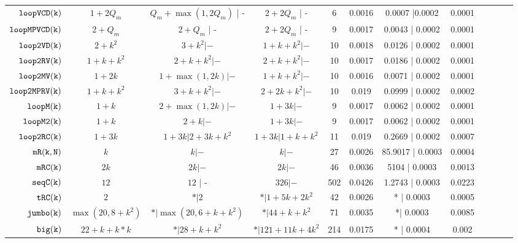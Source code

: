 {\begin {table}[H]
\begin{center}
{\begin{tabular}{| >{\tiny}r | c | c | c | c | c | c | c | c | c | c | c }
         $  {\mathtt{loopVCD(k)}} $ & ${1 + 2Q_m}$ &  ${Q_m+\max(1,2Q_m)}$ | - & $2+2Q_m$ | -  &  6 & 0.0016 & 0.0007 |0.0002 & 0.0001 \\
         $ {\mathtt{loopMPVCD(k)}}$ & $2+Q_m$ &  $2 + Q_m$ | - & $2+2Q_m$ | -  &   9 & 0.0017 & 0.0043 | 0.0002 & 0.0001 \\
         $  \mathtt{loop2VD(k)}$ & $2 + k^2$ &   $3 + k^2| -$ & $1 + k + k^2|- $   &  10 & 0.0018 & 0.0126 | 0.0002 & 0.0001  \\
         $  \mathtt{loop2RV(k)}$ & $1 + k +  k^2$ &  
         $ 2 + k +  k^2 | -$ 
         &  $2 + k + k^2| -$   &  10 & 0.0017 & 0.0186 | 0.0002 & 0.0001  \\
         $  \mathtt{loop2MV(k)}$ & $1 + 2k $ & $1 + \max(1,2k) | -$ &  $1 + k + k^2 |-$  & 10 & 0.0016 & 0.0071 | 0.0002 & 0.0001 \\
         $ \mathtt{loop2MPRV(k)}$ & $1 + k + k^2$ &  $3 + k + k^2  | -$ &  $2 + 2k + k^2 | - $  &  10 & 0.019 & 0.0999 | 0.0002 & 0.0002 \\
         {$ \mathtt{loopM(k)}$} & $1 + k$ &  $ 2 + \max(1,2k) | -$ & $1 + 3k | - $  &  9 & 0.0017 & 0.0062 | 0.0002 & 0.0001  \\
         {$ \mathtt{loopM2(k)}$} & $1 + k$ &  $ 2 + k | -$ & $1 + 3k | - $  &  9 & 0.0017 & 0.0062 | 0.0002 & 0.0001  \\
         {$\mathtt{loop2RC(k)}$} & $1 + 3k$ &  $1 + 3k | 2 + 3k + k^2$ &  $1 + 3k | 1 + k + k^2$  &  11 & 0.019 & 0.2669 | 0.0002 & 0.0007 \\
         $  \mathtt{mR(k, N)}$ & $k$ & $ k | -  $ & $k |-$   &  27 & 0.0026 & 85.9017 | 0.0003 & 0.0004 \\
         $  \mathtt{mRC(k)}$ & $2k$ & $  2k | -$ & $ 2k | -$   &  46 & 0.0036 & 5104 | 0.0003 &  0.0013\\
         $  \mathtt{seqC(k)}$ & $12$ & $12  $ | - & $326 | -$  &  502 & 0.0426  & 1.2743 | 0.0003 & 0.0223 \\
         $  \mathtt{tRC(k)}$ & $2$ &  $ * | 2$ & $* | 1 + 5k + 2 k^2 $  &  42 & 0.0026 & * | 0.0003 & 0.0005\\
         $  \mathtt{{jumbo(k)}}$ & $ \max(20, 8+k^2)$ &  $ * | \max(20, 6+k+k^2)$   &   $* | {44+k+k^2} $  &  71 & 0.0035 & *| 0.0003 &  0.0085 \\
         $  {\mathtt{big(k)}} $ & $22+k+k*k$ &  $* |28 + k + k^2$ &  $* |121+11k+4k^2 $  &  214 & 0.0175 & * | 0.0004 & 0.002 \\
         \hline \hline
        \end{tabular}
}
\end{center}
\end{table}
}


